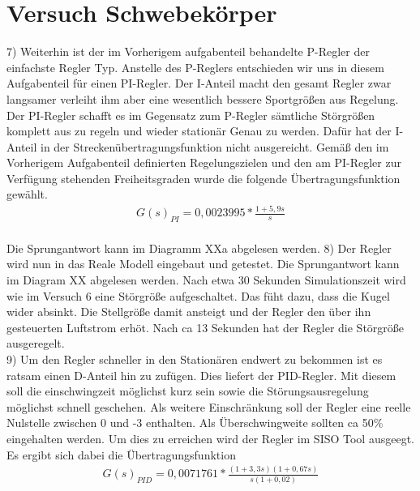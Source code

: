 \documentclass[10pt]{scrartcl}
\begin{document}
\section{Versuch Schwebekörper}
7) Weiterhin ist der im Vorherigem aufgabenteil behandelte P-Regler der einfachste Regler Typ. Anstelle des P-Reglers entschieden wir uns in diesem Aufgabenteil für einen PI-Regler. Der I-Anteil macht den gesamt Regler zwar langsamer verleiht ihm aber eine wesentlich bessere Sportgrößen aus Regelung. Der PI-Regler schafft es im Gegensatz zum P-Regler sämtliche Störgrößen komplett aus zu regeln und wieder stationär Genau zu werden. Dafür hat der I-Anteil in der Streckenübertragungsfunktion nicht ausgereicht. Gemäß den im Vorherigem Aufgabenteil definierten Regelungszielen und den am PI-Regler zur Verfügung stehenden Freiheitsgraden wurde die folgende Übertragungsfunktion gewählt. 
\begin{align}
   G(s)_{PI}=0,0023995*\frac{1+5,9s}{s}
\end{align} \\
Die Sprungantwort kann im Diagramm XXa abgelesen werden.
8) Der Regler wird nun in das Reale Modell eingebaut und getestet. Die Sprungantwort kann im Diagram XX abgelesen werden.
Nach etwa 30 Sekunden Simulationszeit wird wie im Versuch 6 eine Störgröße aufgeschaltet. Das füht dazu, dass die Kugel wider absinkt. Die Stellgröße damit ansteigt und der Regler den über ihn gesteuerten Luftstrom erhöt. Nach ca 13 Sekunden hat der Regler die Störgröße ausgeregelt.\\
9) Um den Regler schneller in den Stationären endwert zu bekommen ist es ratsam einen D-Anteil hin zu zufügen. Dies liefert der PID-Regler.
Mit diesem soll die einschwingzeit möglichst kurz sein sowie die Störungsausregelung möglichst schnell geschehen. Als weitere Einschränkung soll der Regler eine reelle Nulstelle zwischen 0 und -3 enthalten. Als Überschwingweite sollten ca 50\% eingehalten werden.
Um dies zu erreichen wird der Regler im SISO Tool ausgeegt.
Es ergibt sich dabei die Übertragungsfunktion
\begin{align}
   G(s)_{PID}=0,0071761*\frac{(1+3,3s)(1+0,67s)}{s(1+0,02)}
\end{align} \\
\end{document}
